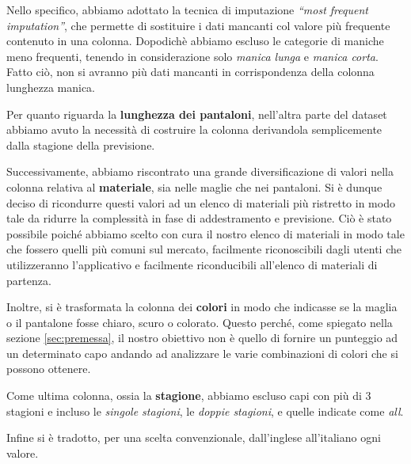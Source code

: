 \documentclass[a4paper, 11pt, oneside]{report}
\begin{document}
\begin{itemize}
                    Nello specifico, abbiamo adottato la tecnica di imputazione \textit{``most frequent imputation''}, che permette
                    di sostituire i dati mancanti col valore più frequente contenuto in una colonna. Dopodichè abbiamo
                    escluso le categorie di maniche meno frequenti, tenendo in considerazione solo \textit{manica lunga} e
                    \textit{manica corta}.
                    Fatto ciò, non si avranno più dati mancanti in corrispondenza della colonna lunghezza manica.
                    \par \noindent Per quanto riguarda la \textbf{lunghezza dei pantaloni}, nell'altra parte del
                    dataset abbiamo avuto la necessità di costruire la colonna derivandola semplicemente dalla stagione della previsione.
                    \par \noindent Successivamente, abbiamo riscontrato una grande
                    diversificazione di valori nella colonna relativa al \textbf{materiale}, sia nelle maglie che nei pantaloni.
                    Si è dunque deciso di ricondurre questi valori ad un elenco di materiali più ristretto in modo tale da ridurre
                    la complessità in fase di addestramento e previsione.
                    Ciò è stato possibile poiché abbiamo scelto con cura il nostro elenco di materiali in modo tale che fossero
                    quelli più comuni sul mercato, facilmente riconoscibili dagli utenti che utilizzeranno l'applicativo e
                    facilmente riconducibili all'elenco di materiali di partenza.
                    \par \noindent Inoltre, si è trasformata la colonna dei \textbf{colori} in modo che indicasse se la maglia o il pantalone
                    fosse chiaro, scuro o colorato.
                    Questo perché, come spiegato nella sezione \ref{sec:premessa}, il nostro obiettivo
                    {non} è quello di fornire un punteggio ad un determinato capo andando ad
                    analizzare le varie combinazioni di colori che si possono ottenere.
                    \par \noindent Come ultima colonna, ossia la \textbf{stagione}, abbiamo escluso capi con più di 3 stagioni
                    e incluso le \textit{singole stagioni}, le \textit{doppie stagioni}, e quelle indicate come \textit{all}.
                    \par \noindent Infine si è tradotto, per una scelta convenzionale, dall'inglese all'italiano ogni valore.
                    \newpage

\end{itemize}
\end{document}
